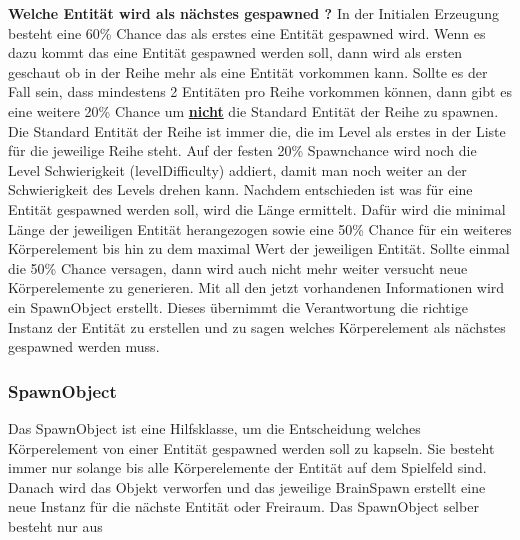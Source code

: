 \documentclass[a4paper,10pt]{report}
\begin{document}
{{{				\noindent
				\textbf{Welche Entität wird als nächstes gespawned ?}
				\newline \newline
				In der Initialen Erzeugung besteht eine 60\% Chance das als erstes eine Entität gespawned wird. 
				\newline \newline
				Wenn es dazu kommt das eine Entität gespawned werden soll, dann wird als ersten geschaut ob in der Reihe mehr als eine Entität vorkommen kann.
				Sollte es der Fall sein, dass mindestens 2 Entitäten pro Reihe vorkommen können, dann gibt es eine weitere 20\% Chance um \textbf{\underline{nicht}} die Standard Entität der Reihe zu spawnen.
				Die Standard Entität der Reihe ist immer die, die im Level als erstes in der Liste für die jeweilige Reihe steht. Auf der festen 20\% Spawnchance wird noch die Level Schwierigkeit (levelDifficulty) 
				addiert, damit man noch weiter an der Schwierigkeit des Levels drehen kann.
				\newpage \noindent
				Nachdem entschieden ist was für eine Entität gespawned werden soll, wird die Länge ermittelt. Dafür wird die minimal Länge der jeweiligen Entität herangezogen sowie eine 50\% Chance für ein weiteres
				Körperelement bis hin zu dem maximal Wert der jeweiligen Entität. Sollte einmal die 50\% Chance versagen, dann wird auch nicht mehr weiter versucht neue Körperelemente zu generieren.
				\newline \newline
				Mit all den jetzt vorhandenen Informationen wird ein SpawnObject erstellt. Dieses übernimmt die Verantwortung die richtige Instanz der Entität zu erstellen und zu sagen welches Körperelement als nächstes
				gespawned werden muss. 				
													
			}
			
			\subsubsection{SpawnObject}
			{
				\label{sssec:spawnobjectclass}
				Das SpawnObject ist eine Hilfsklasse, um die Entscheidung welches Körperelement von einer Entität gespawned werden soll zu kapseln.
				Sie besteht immer nur solange bis alle Körperelemente der Entität auf dem Spielfeld sind. Danach wird das Objekt verworfen und das 
				jeweilige BrainSpawn erstellt eine neue Instanz für die nächste Entität oder Freiraum.
				\newline \newline		
				\noindent
				Das SpawnObject selber besteht nur aus
				
}}}
\end{document}
